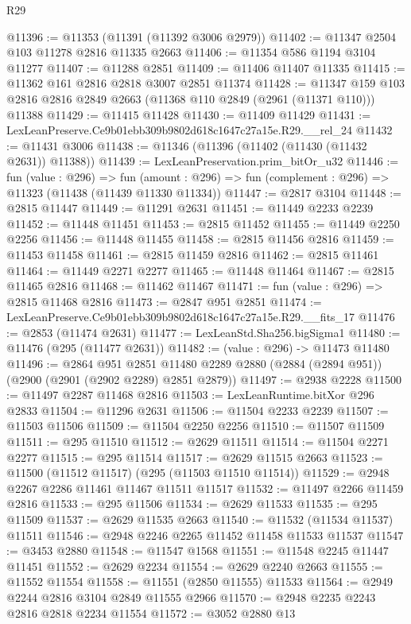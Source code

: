 \begin{lexlean}{R29}
\begin{coremodule}
@11396 := @11353 (@11391 (@11392 @3006 @2979))
@11402 := @11347 @2504 @103 @11278 @2816 @11335 @2663
@11406 := @11354 @586 @1194 @3104 @11277
@11407 := @11288 @2851
@11409 := @11406 @11407 @11335
@11415 := @11362 @161 @2816 @2818 @3007 @2851 @11374
@11428 := @11347 @159 @103 @2816 @2816 @2849 @2663 (@11368 @110 @2849 (@2961 (@11371 @110))) @11388
@11429 := @11415 @11428
@11430 := @11409 @11429
@11431 := LexLeanPreserve.Ce9b01ebb309b9802d618c1647c27a15e.R29.__rel_24
@11432 := @11431 @3006
@11438 := @11346 (@11396 (@11402 (@11430 (@11432 @2631)) @11388))
@11439 := LexLeanPreservation.prim_bitOr_u32
@11446 := fun (value : @296) =>
  fun (amount : @296) => fun (complement : @296) => @11323 (@11438 (@11439 @11330 @11334))
@11447 := @2817 @3104
@11448 := @2815 @11447
@11449 := @11291 @2631
@11451 := @11449 @2233 @2239
@11452 := @11448 @11451
@11453 := @2815 @11452
@11455 := @11449 @2250 @2256
@11456 := @11448 @11455
@11458 := @2815 @11456 @2816
@11459 := @11453 @11458
@11461 := @2815 @11459 @2816
@11462 := @2815 @11461
@11464 := @11449 @2271 @2277
@11465 := @11448 @11464
@11467 := @2815 @11465 @2816
@11468 := @11462 @11467
@11471 := fun (value : @296) => @2815 @11468 @2816
@11473 := @2847 @951 @2851
@11474 := LexLeanPreserve.Ce9b01ebb309b9802d618c1647c27a15e.R29.__fits_17
@11476 := @2853 (@11474 @2631)
@11477 := LexLeanStd.Sha256.bigSigma1
@11480 := @11476 (@295 (@11477 @2631))
@11482 := (value : @296) -> @11473 @11480
@11496 := @2864
    @951
    @2851
    @11480
    @2289
    @2880
    (@2884 (@2894 @951))
    (@2900 (@2901 (@2902 @2289) @2851 @2879))
@11497 := @2938 @2228
@11500 := @11497 @2287 @11468 @2816
@11503 := LexLeanRuntime.bitXor @296 @2833
@11504 := @11296 @2631
@11506 := @11504 @2233 @2239
@11507 := @11503 @11506
@11509 := @11504 @2250 @2256
@11510 := @11507 @11509
@11511 := @295 @11510
@11512 := @2629 @11511
@11514 := @11504 @2271 @2277
@11515 := @295 @11514
@11517 := @2629 @11515 @2663
@11523 := @11500 (@11512 @11517) (@295 (@11503 @11510 @11514))
@11529 := @2948 @2267 @2286 @11461 @11467 @11511 @11517
@11532 := @11497 @2266 @11459 @2816
@11533 := @295 @11506
@11534 := @2629 @11533
@11535 := @295 @11509
@11537 := @2629 @11535 @2663
@11540 := @11532 (@11534 @11537) @11511
@11546 := @2948 @2246 @2265 @11452 @11458 @11533 @11537
@11547 := @3453 @2880
@11548 := @11547 @1568
@11551 := @11548 @2245 @11447 @11451
@11552 := @2629 @2234
@11554 := @2629 @2240 @2663
@11555 := @11552 @11554
@11558 := @11551 (@2850 @11555) @11533
@11564 := @2949 @2244 @2816 @3104 @2849 @11555 @2966
@11570 := @2948 @2235 @2243 @2816 @2818 @2234 @11554
@11572 := @3052 @2880 @13

\end{coremodule}
\end{lexlean}
